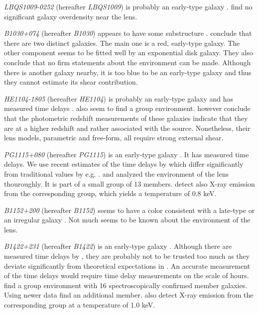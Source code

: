 \documentclass[useAMS,usenatbib]{mn2e}
\begin{document}
\textit{LBQS1009-0252} (hereafter \textit{LBQS1009}) is probably an early-type galaxy \citep{2000ApJ...536..584L}. \cite{2004A&A...428..741F} find no significant galaxy overdensity near the lens.

\textit{B1030+074} (hereafter \textit{B1030}) appears to have some substructure \citep{1998MNRAS.300..649X}. \cite{2000ApJ...536..584L} conclude that there are two distinct galaxies. The main one is a red, early-type galaxy. The other component seems to be fitted well by an exponential disk galaxy. They also conclude that no firm statements about the environment can be made. Although there is another galaxy nearby, it is too blue to be an early-type galaxy and thus they cannot estimate its shear contribution.

\textit{HE1104-1805} (hereafter \textit{HE1104}) is probably an early-type galaxy \citep{2000ApJ...536..584L,2000A&A...360..853C} and has measured time delays \citep{2008ApJ...676...80M}. \cite{2000ApJ...536..584L} also seem to find a group environment. \cite{2004A&A...428..741F} however conclude that the photometric redshift measurements of these galaxies indicate that they are at a higher redshift and rather associated with the source. Nonetheless, their lens models, parametric and free-form, all require strong external shear.

\textit{PG1115+080} (hereafter \textit{PG1115}) is an early-type galaxy \citep{2005ApJ...626...51Y}. It has measured time delays. We use recent estimates of the time delays by \cite{2010MNRAS.406.2764T} which differ significantly from traditional values by e.g. \cite{1997ApJ...489...21B}. \cite{2006ApJ...641..169M} and \cite{2011ApJ...726...84W} analyzed the environment of the lens thouroughly. It is part of a small group of 13 members. \cite{2004ApJ...610..686G} detect also X-ray emission from the corresponding group, which yields a temperature of 0.8 keV.

\textit{B1152+200} (hereafter \textit{B1152}) seems to have a color consistent with a late-type or an irregular galaxy \citep{2000A&A...357..115T}. Not much seems to be known about the environment of the lens.

\textit{B1422+231} (hereafter \textit{B1422}) is an early-type galaxy \citep{1996ApJ...462L..53I}. Although there are measured time delays by \cite{2001MNRAS.326.1403P}, they are probably not to be trusted too much as they deviate significantly from theoretical expectations in \cite{2003AJ....126...29R}. An accurate measurement of the time delays would require time delay measurements on the scale of hours. \cite{2006ApJ...641..169M} find a group environment with 16 spectroscopically confirmed member galaxies. Using newer data \cite{2011ApJ...726...84W} find an additional member. \cite{2004ApJ...610..686G} also detect X-ray emission from the corresponding group at a temperature of 1.0 keV.
\end{document}

